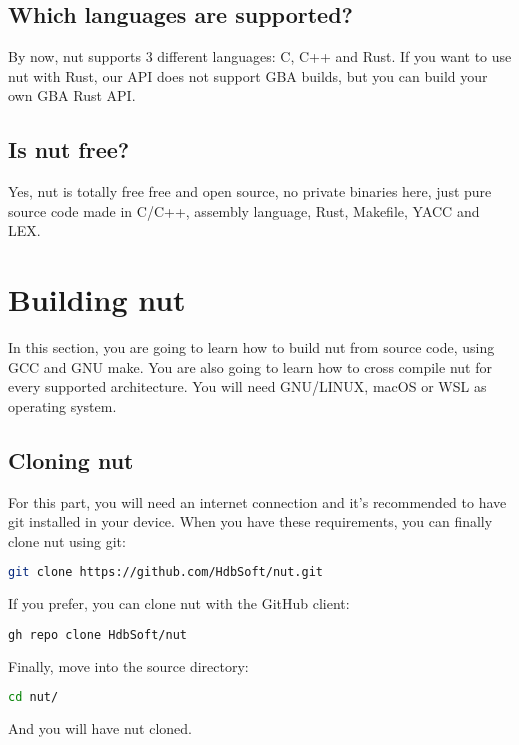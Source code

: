 \documentclass{article}
\begin{document}
  \subsection{Which languages are supported?}
  By now, nut supports 3 different languages: C, C++ and Rust. If you want to use nut with Rust, our API does not support GBA builds, but you can build your own GBA Rust API.
  \\
  \subsection{Is nut free?}
  Yes, nut is totally free free and open source, no private binaries here, just pure source code made in C/C++, assembly language, Rust, Makefile, YACC and LEX.
  \newpage

  \section{Building nut}
  In this section, you are going to learn how to build nut from source code, using GCC and GNU make. You are also going to learn how to cross compile nut for every supported architecture. You will need GNU/LINUX, macOS or WSL as operating system.
  \\
  \subsection{Cloning nut}
  For this part, you will need an internet connection and it's recommended to have git installed in your device. When you have these requirements, you can finally clone nut using git:
  \begin{lstlisting}[language=bash]
  git clone https://github.com/HdbSoft/nut.git\end{lstlisting}
  If you prefer, you can clone nut with the GitHub client:
  \begin{lstlisting}[language=bash]
  gh repo clone HdbSoft/nut\end{lstlisting}
  Finally, move into the source directory:
  \begin{lstlisting}[language=bash]
  cd nut/\end{lstlisting}
  And you will have nut cloned.
  \\
\end{document}

